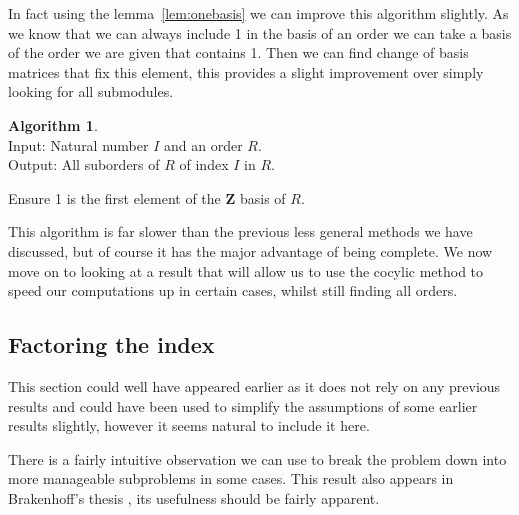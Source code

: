 \documentclass[12pt,a4paper,abstracton,bibtotoc]{scrreprt}
\theoremstyle{definition}
\newtheorem{alg}{Algorithm}
\newcommand{\ZZ}{\mathbf{Z}}
\begin{document}
In fact using the lemma~\ref{lem:onebasis} we can improve this algorithm slightly.
As we know that we can always include 1 in the basis of an order we can take a basis of the order we are given that contains 1.
Then we can find change of basis matrices that fix this element, this provides a slight improvement over simply looking for all submodules.

\begin{alg}~\\
Input: Natural number $I$ and an order $R$.\\
Output: All suborders of $R$ of index $I$ in $R$.\\
\begin{algorithm}[H]
Ensure 1 is the first element of the $\ZZ$ basis of $R$.\\
\end{algorithm}
\end{alg}

This algorithm is far slower than the previous less general methods we have discussed, but of course it has the major advantage of being complete.
We now move on to looking at a result that will allow us to use the cocylic method to speed our computations up in certain cases, whilst still finding all orders.

\subsection{Factoring the index}
This section could well have appeared earlier as it does not rely on any previous results and could have been used to simplify the assumptions of some earlier results slightly, however it seems natural to include it here.

There is a fairly intuitive observation we can use to break the problem down into more manageable subproblems in some cases.
This result also appears in Brakenhoff's thesis \cite[pp. 49--50]{brakenhoff}, its usefulness should be fairly apparent.
\end{document}
